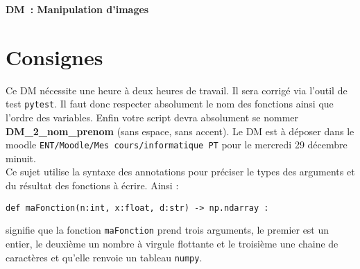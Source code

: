 \documentclass[10pt]{article}
\newcommand{\DocTitle}{Manipulation d'images} %
\newcommand{\DocType}{DM} %
\newcommand{\DocNumber}{} %
\begin{document}
\begin{center}
\vspace{1cm}\textbf{\Large \DocType \ \DocNumber: \DocTitle}
\end{center}


\section{Consignes}
Ce DM nécessite une heure à deux heures de travail. Il sera corrigé via l'outil de test \texttt{pytest}. Il faut donc respecter absolument le nom des fonctions ainsi que l'ordre des variables. Enfin votre script devra absolument se nommer \textbf{DM\_2\_nom\_prenom} (sans espace, sans accent). Le DM est à déposer dans le moodle {\texttt{ENT/Moodle/Mes cours/informatique PT}} pour le mercredi 29 décembre minuit.\\


Ce sujet utilise la syntaxe des annotations pour préciser le types des arguments et du résultat des fonctions à
écrire. Ainsi :%
\begin{center}
\texttt{def maFonction(n:int, x:float, d:str) -> np.ndarray :}
\end{center}
signifie que la fonction \texttt{maFonction} prend trois arguments, le premier est un entier, le deuxième un nombre à virgule flottante et le troisième une chaine de caractères et qu'elle renvoie un tableau \texttt{numpy}.\\



\end{document}
